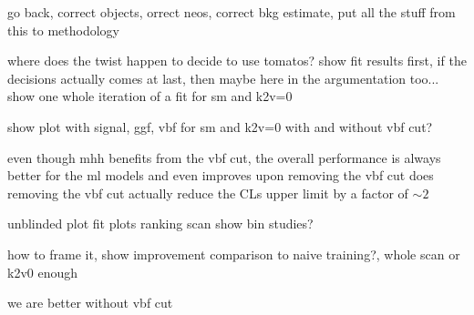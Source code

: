 go back, correct objects,  orrect neos, correct bkg estimate, put all the stuff from this to methodology



where does the twist happen to decide to use tomatos? show fit results first, if the decisions actually comes at last, then maybe here in the argumentation too...
show one whole iteration of a fit for sm and k2v=0

show plot with signal, ggf, vbf for sm and k2v=0 with and without vbf cut?

even though mhh benefits from the vbf cut, the overall performance is always better for the \ac{ml} models and even improves upon removing the vbf cut
does removing the vbf cut actually reduce the CLs upper limit by a factor of $\sim 2$

unblinded plot
fit plots
ranking
scan
show bin studies?

how to frame it, show improvement comparison to naive training?, whole scan or k2v0 enough

we are better without vbf cut



